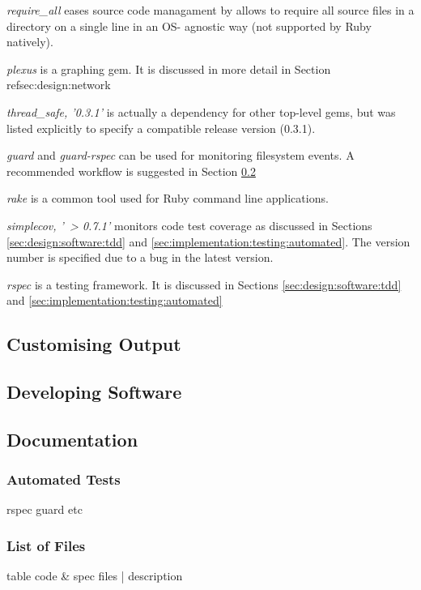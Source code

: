 \textit{require\_all} \parencite{Require+all} eases source code managament by
allows to require all source files in a directory on a single line in an OS-
agnostic way (not supported by Ruby natively).

\textit{plexus} \parencite{Plexus} is a graphing gem. It is discussed in more
detail in Section ref{sec:design:network}

\textit{thread\_safe, '0.3.1'} is actually a dependency for other top-level
gems, but was listed explicitly to specify a compatible release version
(0.3.1).

\textit{guard} and \textit{guard-rspec} \parencite{Guard} can be used for
monitoring filesystem events. A recommended workflow is suggested in Section
\ref{sec:maintenance_manual:developing:guard}

\textit{rake} \parencite{Rake} is a common tool used for Ruby command line
applications.

\textit{simplecov, '~> 0.7.1'} \parencite{Simplecov} monitors code test
coverage as discussed in Sections \ref{sec:design:software:tdd} and
\ref{sec:implementation:testing:automated}. The version number is specified due
to a bug in the latest version.

\textit{rspec} \parencite{Rspec} is a testing framework. It is discussed in
Sections \ref{sec:design:software:tdd} and
\ref{sec:implementation:testing:automated}


\subsection{Customising Output}
\label{sec:maintenance_manual:customising_output}



\subsection{Developing Software}

\label{sec:maintenance_manual:developing:guard}


\subsection{Documentation}

\subsubsection{Automated Tests}
 rspec guard etc

\subsubsection{List of Files}

table
code \& spec files | description
